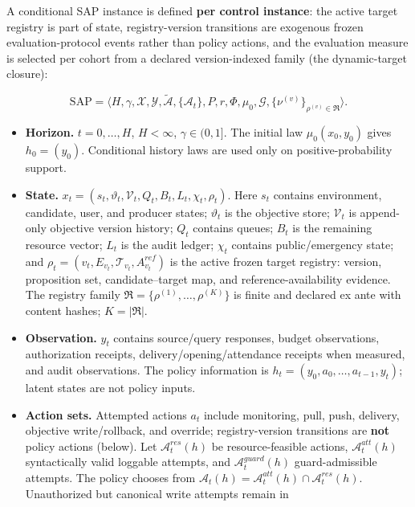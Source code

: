 \documentclass[
  11pt]{article}
\providecommand{\tightlist}{%
  \setlength{\itemsep}{0pt}\setlength{\parskip}{0pt}}
\begin{document}
A conditional SAP instance is defined \textbf{per control instance}: the
active target registry is part of state, registry-version transitions
are exogenous frozen evaluation-protocol events rather than policy
actions, and the evaluation measure is selected per cohort from a
declared version-indexed family (the dynamic-target closure):

\[\mathrm{SAP}=\langle H,\gamma,\mathcal X,\mathcal Y,\widetilde{\mathcal A},\{\mathcal A_t\},P,r,\Phi,\mu_0,\mathcal G,\{\nu^{(v)}\}_{\rho^{(v)}\in\mathfrak R}\rangle.\tag{1}\]

\begin{itemize}
\tightlist
\item
  \textbf{Horizon.} \(t=0,\ldots,H\), \(H<\infty\), \(\gamma\in(0,1]\).
  The initial law \(\mu_0(x_0,y_0)\) gives \(h_0=(y_0)\). Conditional
  history laws are used only on positive-probability support.
\item
  \textbf{State.}
  \(x_t=(s_t,\vartheta_t,\mathcal V_t,Q_t,B_t,L_t,\chi_t,\rho_t)\). Here
  \(s_t\) contains environment, candidate, user, and producer states;
  \(\vartheta_t\) is the objective store; \(\mathcal V_t\) is
  append-only objective version history; \(Q_t\) contains queues;
  \(B_t\) is the remaining resource vector; \(L_t\) is the audit ledger;
  \(\chi_t\) contains public/emergency state; and
  \(\rho_t=(v_t,E_{v_t},\mathcal T_{v_t},A^{ref}_{v_t})\) is the active
  frozen target registry: version, proposition set, candidate--target
  map, and reference-availability evidence. The registry family
  \(\mathfrak R=\{\rho^{(1)},\ldots,\rho^{(K)}\}\) is finite and
  declared ex ante with content hashes; \(K=|\mathfrak R|\).
\item
  \textbf{Observation.} \(y_t\) contains source/query responses, budget
  observations, authorization receipts, delivery/opening/attendance
  receipts when measured, and audit observations. The policy information
  is \(h_t=(y_0,a_0,\ldots,a_{t-1},y_t)\); latent states are not policy
  inputs.
\item
  \textbf{Action sets.} Attempted actions \(a_t\) include monitoring,
  pull, push, delivery, objective write/rollback, and override;
  registry-version transitions are \textbf{not} policy actions (below).
  Let \(\mathcal A^{res}_t(h)\) be resource-feasible actions,
  \(\mathcal A^{att}_t(h)\) syntactically valid loggable attempts, and
  \(\mathcal A^{guard}_t(h)\) guard-admissible attempts. The policy
  chooses from
  \(\mathcal A_t(h)=\mathcal A^{att}_t(h)\cap\mathcal A^{res}_t(h)\).
  Unauthorized but canonical write attempts remain in

\end{itemize}
\end{document}
